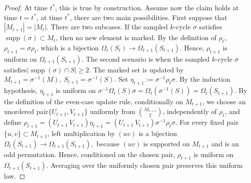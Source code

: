 \begin{proof}
    At time $t^*$, this is true by construction. Assume now the claim holds at time $t = t^*$, at time $t^*$, there are two main possibilities. First suppose that $|M_{t+1}|=|M_t|$. There are two subcases. If the sampled \(k\)-cycle \(\sigma\) satisfies $\operatorname{supp}(\sigma)\subset M_t$, then no new element is marked. By the definition of $\rho_t$, $\rho_{t+1} = \sigma \rho_t$, which is a bijection $\Omega_{t}(S_t)\rightarrow \Omega_{t+1}(S_{t+1})$. Hence, $\rho_{t+1}$ is uniform on $\Omega_{t+1}(S_{t+1})$. The second scenario is when the sampled $k$-cycle $\sigma$ satisfies$
|\operatorname{supp}(\sigma)\cap S|\ge2.$ The marked set is updated by $M_{t+1}=\sigma^{-1}(M),~S_{t+1}=\sigma^{-1}(S).$ Set $\eta_{t+1}:=\sigma^{-1}\rho_t\sigma.$ By the induction hypothesis, $\eta_{t+1}$ is uniform on
$\sigma^{-1}\Omega_t(S)\sigma=\Omega_t(\sigma^{-1}(S))=\Omega_t(S_{t+1}).$
By the definition of the even-case update rule, conditionally
on $M_{t+1}$, we choose an unordered pair$ \{U_{t+1},V_{t+1}\}$
uniformly from $\binom{M_{t+1}}{2}$, independently of $\rho_t$, and define
$\rho_{t+1}=(U_{t+1}\,V_{t+1})\eta_{t+1}=(U_{t+1}\,V_{t+1})\sigma^{-1}\rho_t\sigma.$
For every fixed pair $\{u,v\}\subset M_{t+1}$, left multiplication by $(uv)$ is a bijection
$
\Omega_t(S_{t+1})
\longrightarrow
\Omega_{t+1}(S_{t+1}),
$
because \((uv)\) is supported on \(M_{t+1}\) and is an odd permutation. Hence, conditioned
on the chosen pair, \(\rho_{t+1}\) is uniform on \(\Omega_{t+1}(S_{t+1})\). Averaging over the
uniformly chosen pair preserves this uniform law. 


\end{proof}
